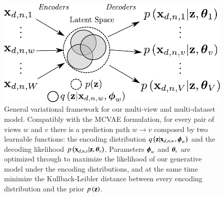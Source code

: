 \begin{figure}[htbp]
\centering
\includegraphics[width=\columnwidth]{./tex/fig/architecture.pdf}
\caption{
General variational framework for our multi-view and multi-dataset model.
Compatibly with the MCVAE formulation, for every pair of views $w$ and $v$
there is a prediction path $w \rightarrow v$ composed by two learnable functions:
the encoding distribution $q\left(\mathbf{z}|\mathbf{x}_{d,n,w}, \boldsymbol{\phi}_w\right)$ and the decoding likelihood $p\left(\mathbf{x}_{d,n,v}|\mathbf{z}, \boldsymbol{\theta}_v\right)$.
Parameters $\boldsymbol{\phi}_w$ and $\boldsymbol{\theta}_v$ are optimized through  to maximize the likelihood of our generative model under the encoding distributions, and at the same time minimize the Kullback-Leibler distance between every encoding distribution and the prior $p\left(\mathbf{z}\right)$.
}
\label{fig:architecture}
\end{figure}
